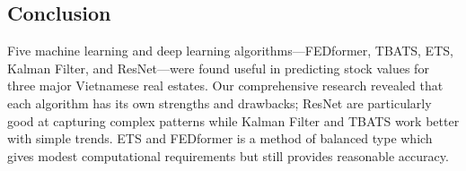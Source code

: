 \documentclass[conference]{IEEEtran}
\begin{document}
\begin{enumerate}


\newpage
\section{Conclusion}
Five machine learning and deep learning algorithms—FEDformer, TBATS, ETS, Kalman Filter, and ResNet—were found useful in predicting stock values for three major Vietnamese real estates. Our comprehensive research revealed that each algorithm has its own strengths and drawbacks; ResNet are particularly good at capturing complex patterns while Kalman Filter and TBATS work better with simple trends. ETS and FEDformer is a method of balanced type which gives modest computational requirements but still provides reasonable accuracy.


\end{enumerate}
\end{document}
